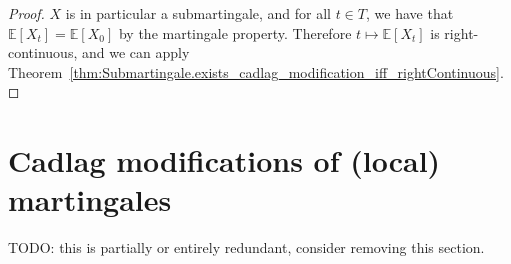 \begin{proof}
$X$ is in particular a submartingale, and for all $t \in T$, we have that $\mathbb{E}[X_t] = \mathbb{E}[X_0]$ by the martingale property.
Therefore $t \mapsto \mathbb{E}[X_t]$ is right-continuous, and we can apply Theorem~\ref{thm:Submartingale.exists_cadlag_modification_iff_rightContinuous}.
\end{proof}




\section{Cadlag modifications of (local) martingales}


TODO: this is partially or entirely redundant, consider removing this section.









